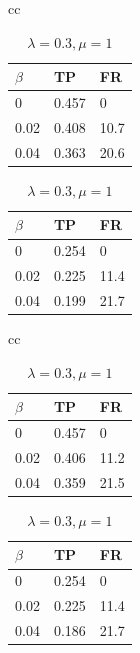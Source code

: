 \documentclass{iseman}
\begin{document}
\setcounter{table}{3}
\begin{table}[htbp]
\begin{center}
\caption{第2工程直後と第4工程直後}
\label{tab:result24}
\begin{tabular}{cc}
\begin{minipage}{0.470\hsize}
\captionsetup{labelformat=empty,labelsep=none}
\caption{$\lambda=0.7, \mu=1$}
	\begin{tabular}{| l | l | l |} \hline
		$\beta$ & TP & FR \\ \hline
		0 	 & 0.457 & 0 \\ \hline
		0.02	 & 0.408 & 10.7 \\ \hline
		0.04	 & 0.363 & 20.6 \\ \hline
	\end{tabular}
\end{minipage}
\begin{minipage}{0.470\hsize}
\captionsetup{labelformat=empty,labelsep=none}
\caption{$\lambda=0.3, \mu=1$}
	\begin{tabular}{| l | l | l |} \hline
		$\beta$ & TP & FR \\ \hline
		0 	 & 0.254 & 0 \\ \hline
		0.02	 & 0.225 & 11.4 \\ \hline
		0.04	 & 0.199 & 21.7 \\ \hline
	\end{tabular}
\end{minipage}
\end{tabular}
\end{center}
\end{table}

\setcounter{table}{4}
\begin{table}[htbp]
\begin{center}
\caption{第3工程直後と第4工程直後}
\label{tab:result34}
\begin{tabular}{cc}
\begin{minipage}{0.470\hsize}
\captionsetup{labelformat=empty,labelsep=none}
\caption{$\lambda=0.7, \mu=1$}
	\begin{tabular}{| l | l | l |} \hline
		$\beta$ & TP & FR \\ \hline
		0 	 & 0.457 & 0 \\ \hline
		0.02	 & 0.406 & 11.2 \\ \hline
		0.04	 & 0.359 & 21.5 \\ \hline
	\end{tabular}
\end{minipage}
\begin{minipage}{0.470\hsize}
\captionsetup{labelformat=empty,labelsep=none}
\caption{$\lambda=0.3, \mu=1$}
	\begin{tabular}{| l | l | l |} \hline
		$\beta$ & TP & FR \\ \hline
		0 	 & 0.254 & 0 \\ \hline
		0.02	 & 0.225 & 11.4 \\ \hline
		0.04	 & 0.186 & 21.7 \\ \hline
	\end{tabular}
\end{minipage}
\end{tabular}
\end{center}
\end{table}
\end{document}
